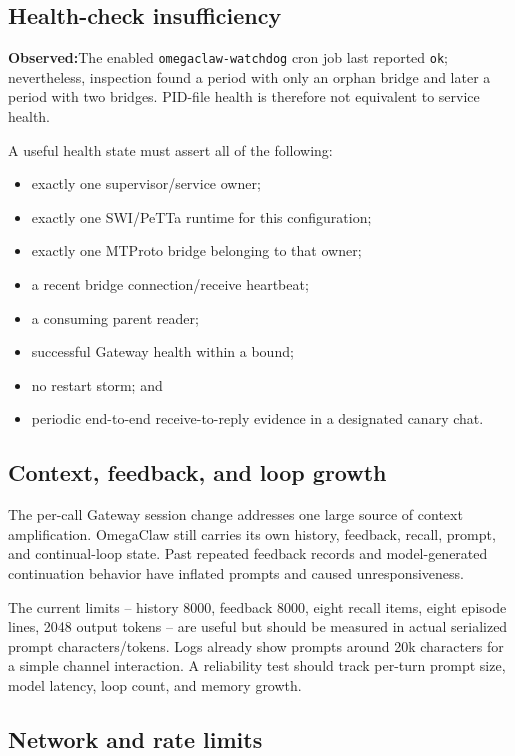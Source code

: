 \documentclass[10pt]{article}
\newcommand{\code}[1]{\texttt{#1}}
\newcommand{\observed}{\textbf{Observed:}}
\begin{document}
\subsection{Health-check insufficiency}

\observed The enabled \code{omegaclaw-watchdog} cron job last reported \code{ok}; nevertheless, inspection found a period with only an orphan bridge and later a period with two bridges. PID-file health is therefore not equivalent to service health.

A useful health state must assert all of the following:
\begin{itemize}
  \item exactly one supervisor/service owner;
  \item exactly one SWI/PeTTa runtime for this configuration;
  \item exactly one MTProto bridge belonging to that owner;
  \item a recent bridge connection/receive heartbeat;
  \item a consuming parent reader;
  \item successful Gateway health within a bound;
  \item no restart storm; and
  \item periodic end-to-end receive-to-reply evidence in a designated canary chat.
\end{itemize}

\subsection{Context, feedback, and loop growth}

The per-call Gateway session change addresses one large source of context amplification. OmegaClaw still carries its own history, feedback, recall, prompt, and continual-loop state. Past repeated feedback records and model-generated continuation behavior have inflated prompts and caused unresponsiveness.

The current limits -- history 8000, feedback 8000, eight recall items, eight episode lines, 2048 output tokens -- are useful but should be measured in actual serialized prompt characters/tokens. Logs already show prompts around 20k characters for a simple channel interaction. A reliability test should track per-turn prompt size, model latency, loop count, and memory growth.

\subsection{Network and rate limits}
\end{document}
